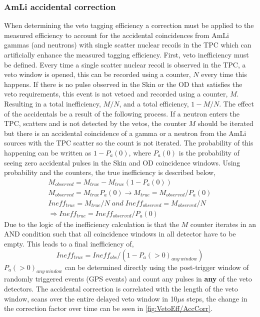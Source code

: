 \subsubsection{AmLi accidental correction}\label{sec:VetoEff/AmLiAccCorrection}
When determining the veto tagging efficiency a correction must be applied to the measured efficiency to account for the accidental coincidences from AmLi gammas (and neutrons) with single scatter nuclear recoils in the TPC which can artificially enhance the measured tagging efficiency.
First, veto inefficiency must be defined. Every time a single scatter nuclear recoil is observed in the TPC, a veto window is opened, this can be recorded using a counter, $N$ every time this happens.
If there is no pulse observed in the Skin or the OD that satisfies the veto requirements, this event is not vetoed and recorded using a counter, $M$. Resulting in a total inefficiency, $M/N$, and a total efficiency, $1-M/N$.
The effect of the accidentals be a result of the following process.
If a neutron enters the TPC, scatters and is not detected by the vetos, the counter $M$ should be iterated but there is an accidental coincidence of a gamma or a neutron from the AmLi sources with the TPC scatter so the count is not iterated.
The probability of this happening can be written as $1-P_a(0)$, where $P_a(0)$ is the probability of seeing zero accidental pulses in the Skin and OD coincidence windows.
Using probability and the counters, the true inefficiency is described below,
\begin{gather*}
	M_{observed}=M_{true}-M_{true}(1-P_a(0)) \\
	M_{observed}=M_{true}P_a(0)\rightarrow M_{true}=M_{observed}/P_a(0)\\
	Ineff_{true}=M_{true}/N\;and\;Ineff_{observed}=M_{observed}/N\\
	\Rightarrow Ineff_{true}=Ineff_{observed}/P_a(0)
\end{gather*}
Due to the logic of the inefficiency calculation is that the $M$ counter iterates in an AND condition such that all coincidence windows in all detector have to be empty.
This leads to a final inefficiency of,
\begin{equation}
	Ineff_{true} = Ineff_{obs}  / (1 - P_a(>0)_{any\:window})
\end{equation}
$P_a(>0)_{any\:window}$ can be determined directly using the post-trigger window of randomly triggered events (GPS events) and count any pulses in \textbf{any} of the veto detectors.
The accidental correction is correlated with the length of the veto window, scans over the entire delayed veto window in 10$\mu$s steps, the change in the correction factor over time can be seen in \autoref{fig:VetoEff/AccCorr}.
